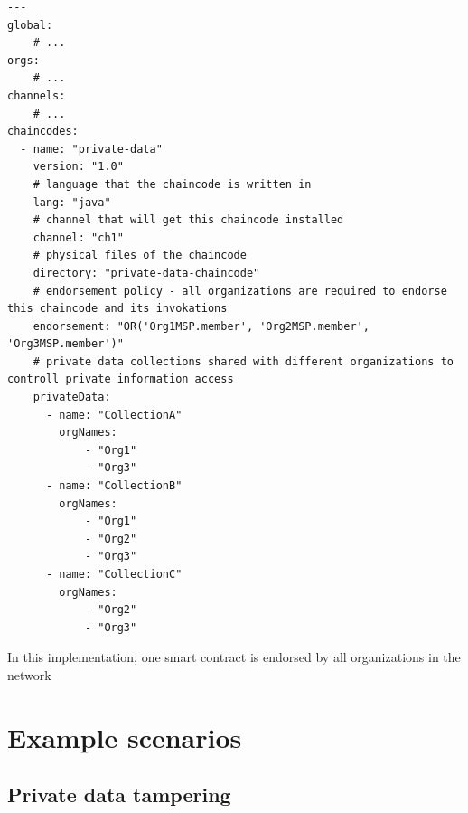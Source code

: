 \documentclass[12pt]{article}
\begin{document}
    \newpage
    \begin{lstlisting}[style=yaml,
        caption={fablo.yaml - configuration file defining network chaincode}, label={lst:chaincode}]
---
global:
    # ...
orgs:
    # ...
channels:
    # ...
chaincodes:
  - name: "private-data"
    version: "1.0"
    # language that the chaincode is written in
    lang: "java"
    # channel that will get this chaincode installed
    channel: "ch1"
    # physical files of the chaincode
    directory: "private-data-chaincode"
    # endorsement policy - all organizations are required to endorse this chaincode and its invokations
    endorsement: "OR('Org1MSP.member', 'Org2MSP.member', 'Org3MSP.member')"
    # private data collections shared with different organizations to controll private information access
    privateData:
      - name: "CollectionA"
        orgNames:
            - "Org1"
            - "Org3"
      - name: "CollectionB"
        orgNames:
            - "Org1"
            - "Org2"
            - "Org3"
      - name: "CollectionC"
        orgNames:
            - "Org2"
            - "Org3"
    \end{lstlisting}


    In this implementation, one smart contract is endorsed by all organizations in the network





    \section{Example scenarios}
    \label{sec:scenarios}


    \subsection{Private data tampering}




    
    
    \newpage
    
    
\end{document}
